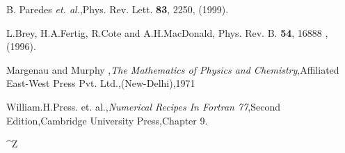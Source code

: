 \begin{references}
 B. Paredes {\sl et. al.},Phys. Rev. Lett. {\bf 83},
2250, (1999).

 L.Brey, H.A.Fertig, R.Cote and A.H.MacDonald, Phys. Rev.
B. {\bf 54}, 16888 , (1996).

 Margenau and Murphy ,{\it The Mathematics of Physics
and Chemistry},Affiliated East-West Press Pvt. Ltd.,(New-Delhi),1971

  William.H.Press. et. al.,{\it Numerical Recipes In
Fortran 77},Second Edition,Cambridge University Press,Chapter 9.
\end{references} 
 
 








^Z
